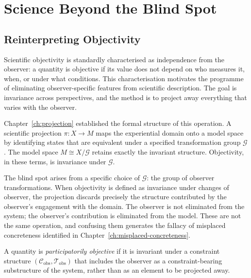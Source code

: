 \documentclass[11pt,openany]{book}
\begin{document}

\chapter{Science Beyond the Blind Spot}
\label{ch:science}

\section{Reinterpreting Objectivity}
\label{sec:objectivity}

Scientific objectivity is standardly characterised as
independence from the observer: a quantity is objective if
its value does not depend on who measures it, when, or
under what conditions.  This characterisation motivates the
programme of eliminating observer-specific features from
scientific description.  The goal is invariance across
perspectives, and the method is to project away everything
that varies with the observer.

Chapter~\ref{ch:projection} established the formal
structure of this operation.  A scientific projection
$\pi : X \to M$ maps the experiential domain onto a model
space by identifying states that are equivalent under a
specified transformation group $\mathcal{G}$.  The model
space $M \cong X / \mathcal{G}$ retains exactly the
invariant structure.  Objectivity, in these terms, is
invariance under $\mathcal{G}$.

The blind spot arises from a specific choice of
$\mathcal{G}$: the group of observer transformations.
When objectivity is defined as invariance under changes of
observer, the projection discards precisely the structure
contributed by the observer's engagement with the domain.
The observer is not eliminated from the system; the
observer's contribution is eliminated from the model.
These are not the same operation, and confusing them
generates the fallacy of misplaced concreteness identified
in Chapter~\ref{ch:misplaced-concreteness}.

\begin{definition}
\label{def:participatory-objectivity}
A quantity is \emph{participatorily objective} if it is
invariant under a constraint structure
$(\mathcal{C}_{\mathrm{obs}}, \mathcal{T}_{\mathrm{obs}})$
that includes the observer as a constraint-bearing
substructure of the system, rather than as an element to
be projected away.
\end{definition}
\end{document}
